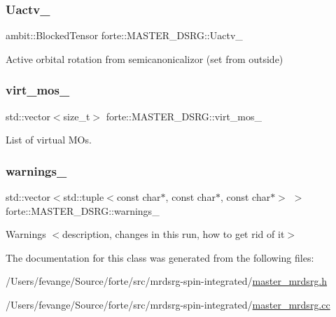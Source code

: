 \subsubsection{\texorpdfstring{Uactv\+\_\+}{Uactv\_}}
{\footnotesize\ttfamily ambit\+::\+Blocked\+Tensor forte\+::\+M\+A\+S\+T\+E\+R\+\_\+\+D\+S\+R\+G\+::\+Uactv\+\_\+\hspace{0.3cm}{\ttfamily [protected]}}



Active orbital rotation from semicanonicalizor (set from outside) 

\mbox{\label{classforte_1_1_m_a_s_t_e_r___d_s_r_g_af8fbd4b67e14757e14efd64522cc7429}} 
\subsubsection{\texorpdfstring{virt\+\_\+mos\+\_\+}{virt\_mos\_}}
{\footnotesize\ttfamily std\+::vector$<$size\+\_\+t$>$ forte\+::\+M\+A\+S\+T\+E\+R\+\_\+\+D\+S\+R\+G\+::virt\+\_\+mos\+\_\+\hspace{0.3cm}{\ttfamily [protected]}}



List of virtual M\+Os. 

\mbox{\label{classforte_1_1_m_a_s_t_e_r___d_s_r_g_a7e080391fc5e3476ae6f1a3e02eee4d1}} 
\subsubsection{\texorpdfstring{warnings\+\_\+}{warnings\_}}
{\footnotesize\ttfamily std\+::vector$<$std\+::tuple$<$const char$\ast$, const char$\ast$, const char$\ast$$>$ $>$ forte\+::\+M\+A\+S\+T\+E\+R\+\_\+\+D\+S\+R\+G\+::warnings\+\_\+\hspace{0.3cm}{\ttfamily [protected]}}



Warnings $<$description, changes in this run, how to get rid of it$>$ 



The documentation for this class was generated from the following files\+:\begin{DoxyCompactItemize}
\item 
/\+Users/fevange/\+Source/forte/src/mrdsrg-\/spin-\/integrated/\mbox{\hyperlink{master__mrdsrg_8h}{master\+\_\+mrdsrg.\+h}}\item 
/\+Users/fevange/\+Source/forte/src/mrdsrg-\/spin-\/integrated/\mbox{\hyperlink{master__mrdsrg_8cc}{master\+\_\+mrdsrg.\+cc}}\end{DoxyCompactItemize}
